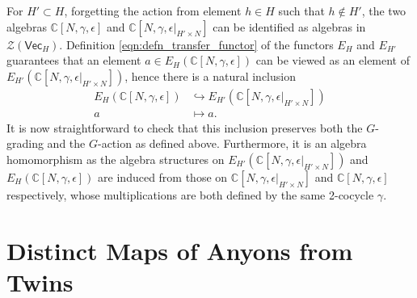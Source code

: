 \documentclass[aps,twocolumn,prx,floatfix,preprintnumbers, nofootinbib,10pt]{revtex4-2}
\numberwithin{equation}{section}
\theoremstyle{definition}
\newcommand{\nn}{\nonumber}
\newcommand{\bC}{{\mathbb C}}
\newcommand{\cZ}{\mathcal{Z}}
\newcommand{\Vect}{\mathsf{Vec}}
\begin{document}
For $H'\subset H$, forgetting the action from element $h\in H$ such that $h\not\in H'$, the two algebras $\bC[N,\gamma,\epsilon]$ and $\bC[N,\gamma,\epsilon|_{H'\times N}]$ can be identified as algebras in $\cZ(\Vect_H)$. Definition \eqref{eqn:defn_transfer_functor} of the functors $E_H$ and $E_{H'}$ guarantees that an element $a\in E_{H}(\bC[N,\gamma,\epsilon])$ can be viewed as an element of $E_{H'}(\bC[N,\gamma,\epsilon|_{H'\times N}])$, hence there is a natural inclusion 
\begin{align}
    E_{H}(\bC[N,\gamma,\epsilon]) & \hookrightarrow E_{H'}(\bC[N,\gamma,\epsilon|_{H'\times N}])\nn\\
    a & \mapsto a.
\end{align}
It is now straightforward to check that this inclusion preserves both the $G$-grading and the $G$-action as defined above. Furthermore, it is an algebra homomorphism as the algebra structures on $E_{H'}(\bC[N,\gamma,\epsilon|_{H'\times N}])$ and $E_{H}(\bC[N,\gamma,\epsilon])$ are induced from those on $\bC[N,\gamma,\epsilon|_{H'\times N}]$ and $\bC[N,\gamma,\epsilon]$ respectively, whose multiplications are both defined by the same 2-cocycle $\gamma$.








\section{Distinct Maps of Anyons from Twins}
\label{app:all-maps-of-anyons}
\end{document}
